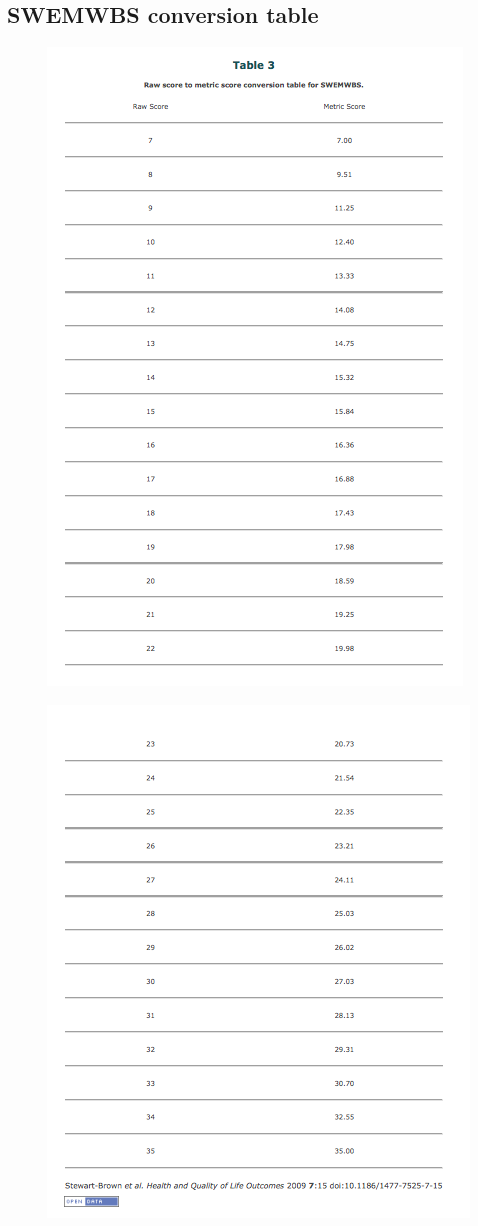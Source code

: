 \documentclass[11pt,openright,a4paper]{report}
\begin{document}
\begin{appendices}
\section{SWEMWBS conversion table} \label{SWEMWBS conversion table}
\begin{figure}[ht]
  \centering
  \includegraphics[width =.7\textwidth]{i/swemwbsconversiontable1.png}
  \label{swemwbsconversiontable}
\end{figure}

\begin{figure}[ht]
  \centering
  \includegraphics[width =.7\textwidth]{i/swemwbsconversiontable2.png}
\end{figure}
\end{appendices}
\end{document}
